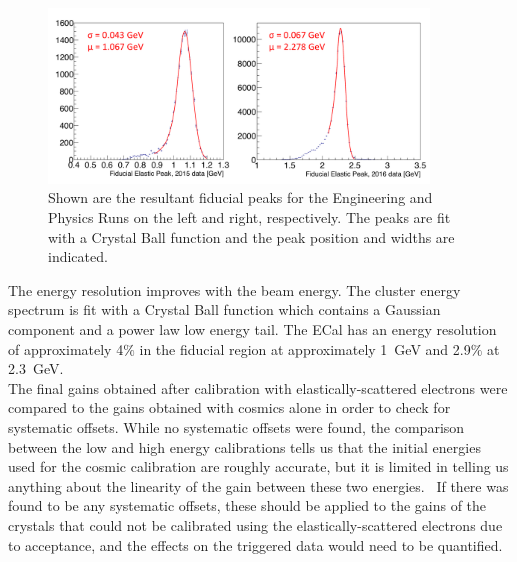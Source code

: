 \begin{figure}[H]
  \centering
      \includegraphics[width=0.9\textwidth]{pics/performance/feePeakFid.png}
  \caption[Reconstructed elastic peak in the ECal for the Engineering and Physics Runs]{Shown are the resultant fiducial peaks for the Engineering and Physics Runs on the left and right, respectively. The peaks are fit with a Crystal Ball function and the peak position and widths are indicated. }
  \label{Figure:FeeFidPeak}
\end{figure}

The energy resolution improves with the beam energy. The cluster energy spectrum is fit with a Crystal Ball function which contains a Gaussian component and a power law low energy tail. The ECal has an energy resolution of approximately 4$\%$ in the fiducial region at approximately 1~GeV and 2.9$\%$ at 2.3~GeV. \\
\indent The final gains obtained after calibration with elastically-scattered electrons were compared to the gains obtained with cosmics alone in order to check for systematic offsets. While no systematic offsets were found, the comparison between the low and high energy calibrations tells us that the initial energies used for the cosmic calibration are roughly accurate, but it is limited in telling us anything about the linearity of the gain between these two energies.~\cite{CalibNote} If there was found to be any systematic offsets, these should be applied to the gains of the crystals that could not be calibrated using the elastically-scattered electrons due to acceptance, and the effects on the triggered data would need to be quantified. 

